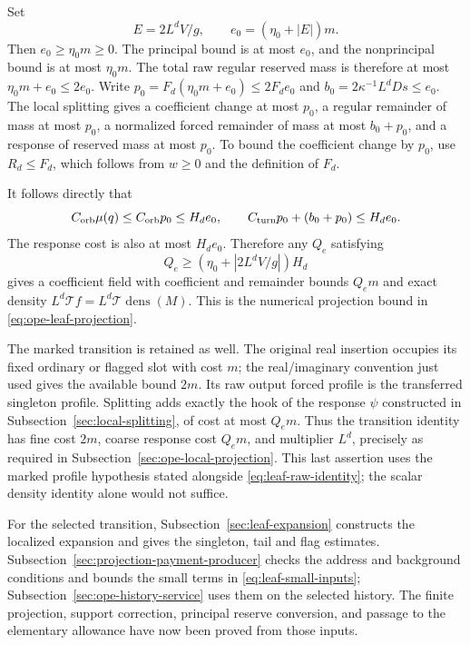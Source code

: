 Set
\[
         E=2L^dV/g,\qquad e_0=(\eta_0+|E|)m.
\]
Then $e_0\ge\eta_0m\ge0$. The principal bound is at most $e_0$,
and the nonprincipal bound is at most $\eta_0m$. The total raw regular
reserved mass is therefore at most $\eta_0m+e_0\le2e_0$.
Write $p_0=F_d(\eta_0m+e_0)\le2F_de_0$ and
$b_0=2\kappa^{-1}L^dDs\le e_0$.
The local splitting gives a coefficient change at most $p_0$,
a regular remainder of mass at most $p_0$, a normalized forced
remainder of mass at most $b_0+p_0$, and a response of reserved
mass at most $p_0$. To bound the coefficient change by $p_0$,
use $R_d\le F_d$, which follows from $w\ge0$ and the definition
of $F_d$.

It follows directly that
\[
 C_{\rm orb}\mu(q)\le C_{\rm orb}p_0\le H_de_0,
 \qquad
 C_{\rm turn}p_0+(b_0+p_0)\le H_de_0.
\]
The response cost is also at most $H_de_0$. Therefore any
$Q_e$ satisfying
\begin{equation}\label{eq:leaf-projection-allowance}
                  Q_e\ge(\eta_0+|2L^dV/g|)H_d
\end{equation}
gives a coefficient field with coefficient and remainder bounds
$Q_em$ and exact density $L^d\mathcal T f=L^d\mathcal T\operatorname{dens}(M)$.
This is the numerical projection bound in
\eqref{eq:ope-leaf-projection}.

The marked transition is retained as well. The original real
insertion occupies its fixed ordinary or flagged slot with cost
$m$; the real/imaginary convention just used gives the available
bound $2m$. Its raw output forced profile is the transferred
singleton profile. Splitting adds exactly the hook of the response
$\psi$ constructed in Subsection~\ref{sec:local-splitting}, of cost
at most $Q_em$. Thus the transition identity has fine cost $2m$,
coarse response cost $Q_em$, and multiplier $L^d$, precisely as
required in Subsection~\ref{sec:ope-local-projection}.
This last assertion uses the marked profile hypothesis stated alongside
\eqref{eq:leaf-raw-identity}; the scalar density identity alone would
not suffice.

For the selected transition, Subsection~\ref{sec:leaf-expansion}
constructs the localized expansion and gives the singleton, tail and flag
estimates. Subsection~\ref{sec:projection-payment-producer} checks the
address and background conditions and bounds the small terms in
\eqref{eq:leaf-small-inputs}; Subsection~\ref{sec:ope-history-service}
uses them on the selected history.
The finite projection, support correction, principal reserve
conversion, and passage to the elementary allowance have now been
proved from those inputs.
